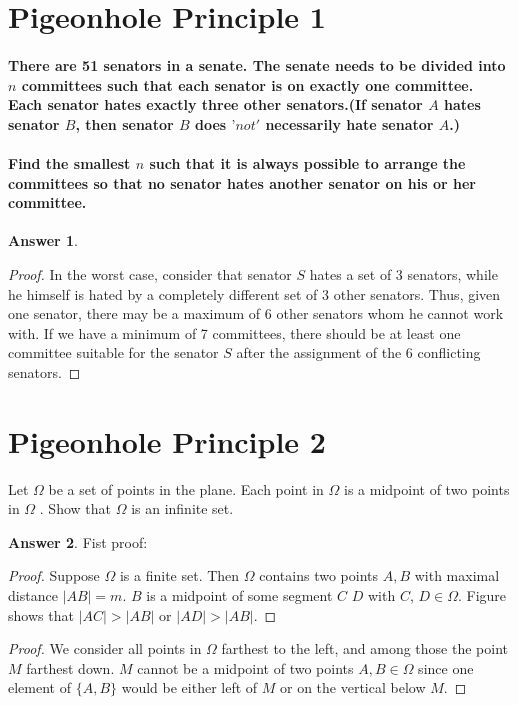 \documentclass{article}
\renewcommand{\(}{\left(}
\renewcommand{\)}{\right)}
\theoremstyle{plain}
\theoremstyle{plain}
\theoremstyle{definition}
\newtheorem*{answer}{Answer}
\begin{document}
\section{Pigeonhole Principle 1}
\paragraph*{
There are 51 senators in a senate. The senate needs to be divided into $n$ committees such that each senator is on exactly one committee. Each senator hates exactly three other senators.(If senator $A$ hates senator $B$, then senator $B$ does $’not'$ necessarily hate senator $A$.)
}
\paragraph*{
Find the smallest $n$ such that it is always possible to arrange the committees so that no senator hates another senator on his or her committee.
}
\begin{shaded}
\begin{answer}
\begin{proof}
In the worst case, consider that senator $S$ hates a set of 3 senators, while he himself is hated by a completely different set of 3 other senators. Thus, given one senator, there may be a maximum of 6 other senators whom he cannot work with. If we have a minimum of 7 committees, there should be at least one committee suitable for the senator $S$ after the assignment of the 6 conflicting senators.
\end{proof}
\end{answer}
\end{shaded}

\section{Pigeonhole Principle 2}
Let $\Omega$ be a set of points in the plane. Each point in $\Omega$ is a midpoint of two points in $\Omega$ . Show that $\Omega$ is an infinite set.
\begin{shaded}
\begin{answer}

Fist proof:
\begin{proof}
Suppose $\Omega$ is a finite set. Then $\Omega$ contains two points $A, B$ with
maximal distance $|AB|  = m $. $B$ is a midpoint of some segment $C $ $ D $ with $C$, $ D  \in \Omega $.
Figure
 shows that $ |AC| > |AB|$ or $|AD| > |AB|$.
\end{proof}


\begin{proof}
We consider all points in $\Omega$ farthest to the left, and among those
the point $M$ farthest down. $M$ cannot be a midpoint of two points $A,B \in \Omega $ since
one element of $\{A,B\}$ would be either left of $M$ or on the vertical below $M$.
\end{proof}
\end{answer}
\end{shaded}
\end{document}

